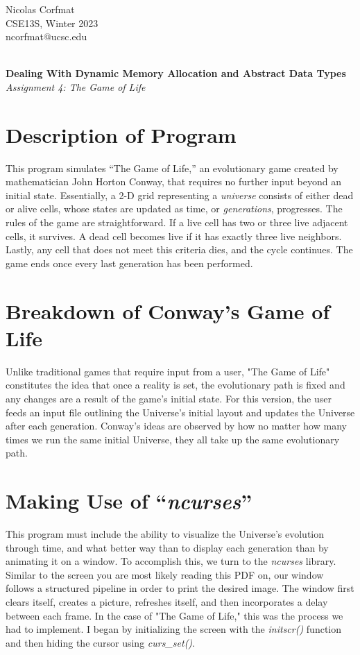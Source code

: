 \documentclass[12pt]{article}
\begin{document}
\flushright
Nicolas Corfmat \\CSE13S, Winter 2023 \\ ncorfmat@ucsc.edu

\flushleft
\LARGE
\textbf{\\Dealing With Dynamic Memory Allocation and Abstract Data Types}
\large
\\\textit{Assignment 4: The Game of Life}

\section{Description of Program}
\normalsize

This program simulates “The Game of Life,” an evolutionary game created by mathematician John Horton Conway, that requires no further input beyond an initial state. Essentially, a 2-D grid representing a \textit{universe} consists of either dead or alive cells, whose states are updated as time, or \textit{generations}, progresses. The rules of the game are straightforward. If a live cell has two or three live adjacent cells, it survives. A dead cell becomes live if it has exactly three live neighbors. Lastly, any cell that does not meet this criteria dies, and the cycle continues. The game ends once every last generation has been performed.


\section{Breakdown of Conway's Game of Life}

Unlike traditional games that require input from a user, "The Game of Life" constitutes the idea that once a reality is set, the evolutionary path is fixed and any changes are a result of the game's initial state. For this version, the user feeds an input file outlining the Universe's initial layout and updates the Universe after each generation. Conway's ideas are observed by how no matter how many times we run the same initial Universe, they all take up the same evolutionary path.

\section{Making Use of \enquote{\textit{ncurses}}}

This program must include the ability to visualize the Universe's evolution through time, and what better way than to display each generation than by animating it on a window. To accomplish this, we turn to the \textit{ncurses} library. Similar to the screen you are most likely reading this PDF on, our window follows a structured pipeline in order to print the desired image. The window first clears itself, creates a picture, refreshes itself, and then incorporates a delay between each frame. In the case of "The Game of Life," this was the process we had to implement. I began by initializing the screen with the \textit{initscr()} function and then hiding the cursor using \textit{curs_set()}.
\end{document}
